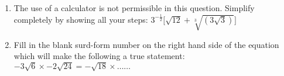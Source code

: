 \begin{enumerate}
\item{The use of a calculator is not permissible in this question. Simplify completely by showing all your steps: $3^{-\tfrac{1}{2}}\biggl[\sqrt{12} + \sqrt[3]{(3\sqrt{3})}\biggr]$}

\item{Fill in the blank surd-form number on the right hand side of the equation which will make the following a true statement:  $ -3\sqrt{6} \times -2\sqrt{24} = - \sqrt{18} \times \ldots \ldots $}

\end{enumerate}







